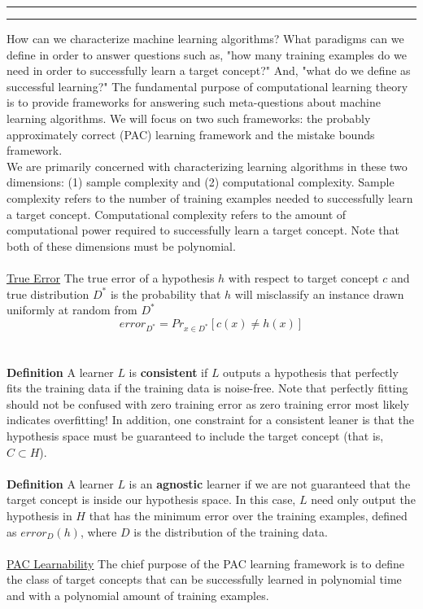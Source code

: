 \documentclass[11pt]{article}
\newcounter{questionCounter}
\newcounter{partCounter}[questionCounter]
\newenvironment{question}[2][\arabic{questionCounter}]{%
    \addtocounter{questionCounter}{1}%
    \setcounter{partCounter}{0}%
    \vspace{.25in} \hrule \vspace{0.5em}%
        \noindent{\bf #1: #2}%
    \vspace{0.8em} \hrule \vspace{.10in}%
}{}
\begin{document}
\begin{question}{Computational Learning Theory:}
How can we characterize machine learning algorithms? What paradigms can we define in order to answer questions such as, "how many training examples do we need in order to successfully learn a target concept?" And, "what do we define as successful learning?" The fundamental purpose of computational learning theory is to provide frameworks for answering such meta-questions about machine learning algorithms. We will focus on two such frameworks: the probably approximately correct (PAC) learning framework and the mistake bounds framework.
\\
We are primarily concerned with characterizing learning algorithms in these two dimensions: (1) sample complexity and (2) computational complexity. Sample complexity refers to the number of training examples needed to successfully learn a target concept. Computational complexity refers to the amount of computational power required to successfully learn a target concept. Note that both of these dimensions must be polynomial.
\\
\\
\underline{True Error} The true error of a hypothesis $h$ with respect to target concept $c$ and true distribution $D^*$ is the probability that $h$ will misclassify an instance drawn uniformly at random from $D^*$ $$error_{D^*} = Pr_{x\in D^*}[c(x) \not = h(x)]$$
\\
\\
\textbf{Definition} A learner $L$ is \textbf{consistent} if $L$ outputs a hypothesis that perfectly fits the training data if the training data is noise-free. Note that perfectly fitting should not be confused with zero training error as zero training error most likely indicates overfitting! In addition, one constraint for a consistent leaner is that the hypothesis space must be guaranteed to include the target concept (that is, $C \subset H$).
\\
\\
\textbf{Definition} A learner $L$ is an \textbf{agnostic} learner if we are not guaranteed that the target concept is inside our hypothesis space. In this case, $L$ need only output the hypothesis in $H$ that has the minimum error over the training examples, defined as $error_D(h)$, where $D$ is the distribution of the training data.
\\
\\
\underline{PAC Learnability} The chief purpose of the PAC learning framework is to define the class of target concepts that can be successfully learned in polynomial time and with a polynomial amount of training examples.

\end{question}
\end{document}
